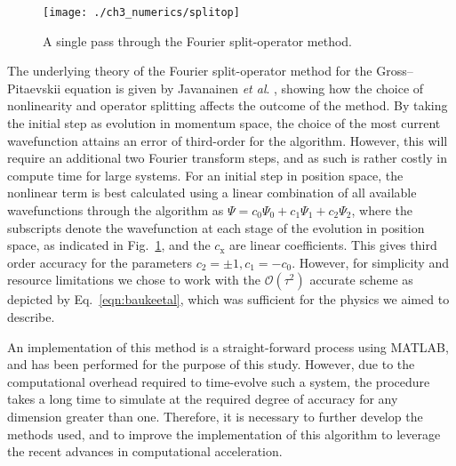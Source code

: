 \begin{figure}
    \centering
    \texttt{[image: ./ch3\_numerics/splitop]}
    \caption{A single pass through the Fourier split-operator method.}
    \label{fig:num_splitop}
\end{figure}

The underlying theory of the Fourier split-operator method for the Gross--Pitaevskii equation is given by Javanainen \textit{et al}. \cite{BEC:Javanainen_jphysa_2006}, showing how the choice of nonlinearity and operator splitting affects the outcome of the method. By taking the initial step as evolution in momentum space, the choice of the most current wavefunction attains an error of third-order for the algorithm. However, this will require an additional two Fourier transform steps, and as such is rather costly in compute time for large systems. For an initial step in position space, the nonlinear term is best calculated using a linear combination of all available wavefunctions through the algorithm as $\Psi = c_0\Psi_0 + c_1\Psi_1 + c_2\Psi_2$, where the subscripts denote the wavefunction at each stage of the evolution in position space, as indicated in Fig.~\ref{fig:num_splitop}, and the $c_{\textrm{x}}$ are linear coefficients. This gives third order accuracy for the parameters $c_2=\pm 1, c_1=-c_0$. However, for simplicity and resource limitations we chose to work with the $\mathcal{O}\left(\tau^2\right)$ accurate scheme as depicted by Eq.~\eqref{eqn:baukeetal}, which was sufficient for the physics we aimed to describe.

An implementation of this method is a straight-forward process using MATLAB, and has been performed for the purpose of this study. However, due to the computational overhead required to time-evolve such a system, the procedure takes a long time to simulate at the required degree of accuracy for any dimension greater than one. Therefore, it is necessary to further develop the methods used, and to improve the implementation of this algorithm to leverage the recent advances in computational acceleration.

